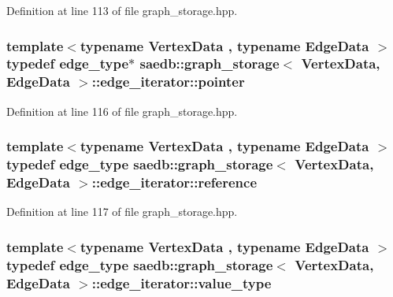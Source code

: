 Definition at line 113 of file graph\-\_\-storage.\-hpp.

\hypertarget{classsaedb_1_1graph__storage_1_1edge__iterator_a387ef43e028c606818c1eff451f33d1c}{
\subsubsection[{pointer}]{\setlength{\rightskip}{0pt plus 5cm}template$<$typename Vertex\-Data , typename Edge\-Data $>$ typedef {\bf edge\-\_\-type}$\ast$ {\bf saedb\-::graph\-\_\-storage}$<$ Vertex\-Data, Edge\-Data $>$\-::{\bf edge\-\_\-iterator\-::pointer}}}\label{d8/d8a/classsaedb_1_1graph__storage_1_1edge__iterator_a387ef43e028c606818c1eff451f33d1c}


Definition at line 116 of file graph\-\_\-storage.\-hpp.

\hypertarget{classsaedb_1_1graph__storage_1_1edge__iterator_a2f581a4c04f23e1dab137fb7ec5f1e75}{
\subsubsection[{reference}]{\setlength{\rightskip}{0pt plus 5cm}template$<$typename Vertex\-Data , typename Edge\-Data $>$ typedef {\bf edge\-\_\-type} {\bf saedb\-::graph\-\_\-storage}$<$ Vertex\-Data, Edge\-Data $>$\-::{\bf edge\-\_\-iterator\-::reference}}}\label{d8/d8a/classsaedb_1_1graph__storage_1_1edge__iterator_a2f581a4c04f23e1dab137fb7ec5f1e75}


Definition at line 117 of file graph\-\_\-storage.\-hpp.

\hypertarget{classsaedb_1_1graph__storage_1_1edge__iterator_acd702148975e7e70c037eb2eade2c42e}{
\subsubsection[{value\-\_\-type}]{\setlength{\rightskip}{0pt plus 5cm}template$<$typename Vertex\-Data , typename Edge\-Data $>$ typedef {\bf edge\-\_\-type} {\bf saedb\-::graph\-\_\-storage}$<$ Vertex\-Data, Edge\-Data $>$\-::{\bf edge\-\_\-iterator\-::value\-\_\-type}}}\label{d8/d8a/classsaedb_1_1graph__storage_1_1edge__iterator_acd702148975e7e70c037eb2eade2c42e}


